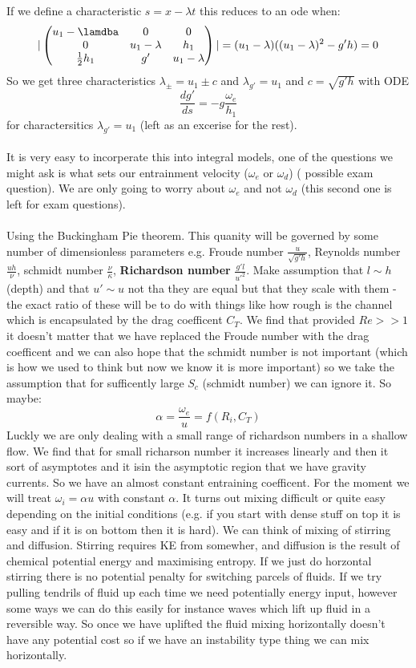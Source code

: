 \documentclass{article}
\begin{document}
If we define a characteristic $s = x - \lambda t$ this reduces to an ode when:
$$
 | \begin{pmatrix} u_1 - \lamdba & 0 & 0 \\
         0 & u_1 - \lambda & h_1 \\
 \frac{1}{2} h_1 & g' & u_1 - \lambda \end{pmatrix} | = (u_1 - \lambda)((u_1 - \lambda)^2 - g' h) = 0
$$
So we get three characteristics $\lambda_{\pm} = u_1 \pm c$ and $\lambda_{g'} = u_1$ and $c = \sqrt{g' h}$ with ODE $$
\frac{d g'}{ds} = - g \frac{\omega_e}{h_1}
$$
for charactersitics $\lambda_{g'} = u_1$ (left as an excerise for the rest).\\\\
It is very easy to incorperate this into integral models, one of the questions we might ask is what sets our entrainment velocity ($\omega_e$ or $\omega_d$) ( possible exam question). We are only going to worry about $\omega_e$ and not $\omega_d$ (this second one is left for exam questions).\\\\ Using the Buckingham Pie theorem. This quanity will be governed by some number of dimensionless parameters e.g. Froude number $\frac{u}{\sqrt{g' h}}$, Reynolds number $\frac{uh}{\nu}$, schmidt number $\frac{\nu}{\kappa}$, \textbf{Richardson number} $ \frac{g' l}{u'^2}$. Make assumption that $l \sim h$ (depth) and that $u' \sim u$  not tha they are equal but that they scale with them - the exact ratio of these will be to do with things like how rough is the channel which is encapsulated by the drag coefficent $C_T$. We find that provided $Re >>1$ it doesn't matter that we have replaced the Froude number with the drag coefficent and we can also hope that the schmidt number is not important (which is how we used to think but now we know it is more important) so we take the assumption that for sufficently large $S_c$ (schmidt number) we can ignore it. So maybe:
$$ \alpha = \frac{\omega_e}{u} = f( R_i , C_T)
$$
Luckly we are only dealing with a small range of richardson numbers in a shallow flow. We find that for small richarson number it increases linearly and then it sort of asymptotes and it isin the asymptotic region that we have gravity currents. So we have an almost constant entraining coefficent. For the moment we will treat $\omega_i = \alpha u$ with constant $\alpha$. It turns out mixing difficult or quite easy depending on the initial conditions (e.g. if you start with dense stuff on top it is easy and if it is on bottom then it is hard). We can think of mixing of stirring and diffusion. Stirring requires KE from somewher, and diffusion is the result of chemical potential energy and maximising entropy. If we just do horzontal stirring there is no potential penalty for switching parcels of fluids. If we try pulling tendrils of fluid up each time we need potentially energy input, however some ways we can do this easily for instance waves which lift up fluid in a reversible way. So once we have uplifted the fluid mixing horizontally doesn't have any potential cost so if we have an instability type thing we can mix horizontally.\\\\
\end{document}
